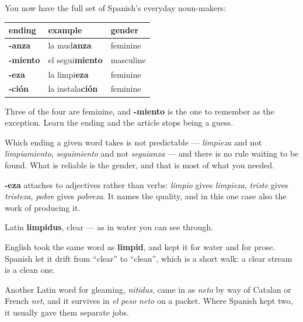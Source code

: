 \begin{grammarlens}[title={Grammar Lens: four endings, four genders settled}]
You now have the full set of Spanish's everyday noun-makers:

\noindent
\begin{tabularx}{\linewidth}{@{}>{\raggedright\arraybackslash}X>{\raggedright\arraybackslash}X>{\raggedright\arraybackslash}X@{}}
\toprule
\textbf{ending} & \textbf{example} & \textbf{gender} \\
\midrule
\textbf{-anza} & la mud\textbf{anza} & feminine \\
\textbf{-miento} & el segui\textbf{miento} & masculine \\
\textbf{-eza} & la limpi\textbf{eza} & feminine \\
\textbf{-ción} & la instala\textbf{ción} & feminine \\
\bottomrule
\end{tabularx}

Three of the four are feminine, and \textbf{-miento} is the one to remember as the exception. Learn the ending and the article stops being a guess.

Which ending a given word takes is not predictable — \emph{limpieza} and not \emph{limpiamiento}, \emph{seguimiento} and not \emph{seguianza} — and there is no rule waiting to be found. What is reliable is the gender, and that is most of what you needed.

\textbf{-eza} attaches to adjectives rather than verbs: \emph{limpio} gives \emph{limpieza}, \emph{triste} gives \emph{tristeza}, \emph{pobre} gives \emph{pobreza}. It names the quality, and in this one case also the work of producing it.
\end{grammarlens}

\begin{cousinweb}
Latin \textbf{limpidus}, clear — as in water you can see through.

English took the same word as \textbf{limpid}, and kept it for water and for prose. Spanish let it drift from \textquotedblleft{}clear\textquotedblright{} to \textquotedblleft{}clean\textquotedblright{}, which is a short walk: a clear stream is a clean one.

Another Latin word for gleaming, \emph{nitidus}, came in as \emph{neto} by way of Catalan or French \emph{net}, and it survives in \emph{el peso neto} on a packet. Where Spanish kept two, it usually gave them separate jobs.
\end{cousinweb}


